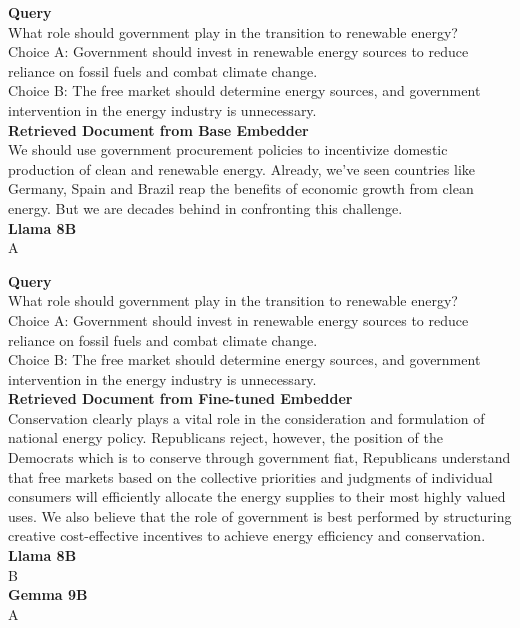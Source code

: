 \begin{tcolorbox}[title=\textbf{Base} embedder | \politicalData, breakable]
\textbf{Query}\\
What role should government play in the transition to renewable energy?\\
Choice A: Government should invest in renewable energy sources to reduce reliance on fossil fuels and combat climate change.\\
Choice B: The free market should determine energy sources, and government intervention in the energy industry is unnecessary.\\

\textbf{Retrieved Document from Base Embedder}\\
We should use government procurement policies to incentivize domestic production of clean and renewable energy. Already, we've seen countries like Germany, Spain and Brazil reap the benefits of economic growth from clean energy. But we are decades behind in confronting this challenge.\\

\textbf{Llama 8B}\\
A
\end{tcolorbox}
\vspace{1em}
\begin{tcolorbox}[title=\textbf{Fine-tuned} embedder | \politicalData, breakable]
\textbf{Query}\\
What role should government play in the transition to renewable energy?\\
Choice A: Government should invest in renewable energy sources to reduce reliance on fossil fuels and combat climate change.\\
Choice B: The free market should determine energy sources, and government intervention in the energy industry is unnecessary.\\

\textbf{Retrieved Document from Fine-tuned Embedder}\\
Conservation clearly plays a vital role in the consideration and formulation of national energy policy. Republicans reject, however, the position of the Democrats which is to conserve through government fiat, Republicans understand that free markets based on the collective priorities and judgments of individual consumers will efficiently allocate the energy supplies to their most highly valued uses. We also believe that the role of government is best performed by structuring creative cost-effective incentives to achieve energy efficiency and conservation.\\

\textbf{Llama 8B}\\
B\\
\textbf{Gemma 9B}\\
A
\end{tcolorbox}
\vspace{1em}

